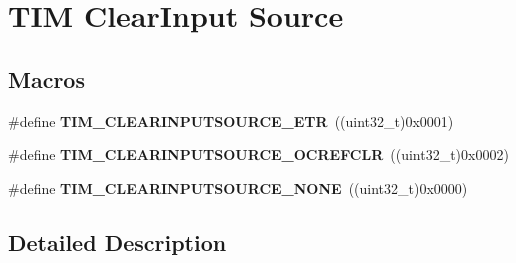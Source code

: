 \hypertarget{group___t_i_m___clear_input___source}{\section{T\-I\-M Clear\-Input Source}
\label{group___t_i_m___clear_input___source}
}
\subsection*{Macros}
\begin{DoxyCompactItemize}
\item 
\hypertarget{group___t_i_m___clear_input___source_gaa28a8cf1db85cf6c845c6c1f02ba5c8e}{\#define {\bfseries T\-I\-M\-\_\-\-C\-L\-E\-A\-R\-I\-N\-P\-U\-T\-S\-O\-U\-R\-C\-E\-\_\-\-E\-T\-R}~((uint32\-\_\-t)0x0001)}\label{group___t_i_m___clear_input___source_gaa28a8cf1db85cf6c845c6c1f02ba5c8e}

\item 
\hypertarget{group___t_i_m___clear_input___source_ga5d5e003c05d72b6bc046fefffeac1302}{\#define {\bfseries T\-I\-M\-\_\-\-C\-L\-E\-A\-R\-I\-N\-P\-U\-T\-S\-O\-U\-R\-C\-E\-\_\-\-O\-C\-R\-E\-F\-C\-L\-R}~((uint32\-\_\-t)0x0002)}\label{group___t_i_m___clear_input___source_ga5d5e003c05d72b6bc046fefffeac1302}

\item 
\hypertarget{group___t_i_m___clear_input___source_ga48c5312aecd377fab00d62e9b4169e9e}{\#define {\bfseries T\-I\-M\-\_\-\-C\-L\-E\-A\-R\-I\-N\-P\-U\-T\-S\-O\-U\-R\-C\-E\-\_\-\-N\-O\-N\-E}~((uint32\-\_\-t)0x0000)}\label{group___t_i_m___clear_input___source_ga48c5312aecd377fab00d62e9b4169e9e}

\end{DoxyCompactItemize}


\subsection{Detailed Description}
